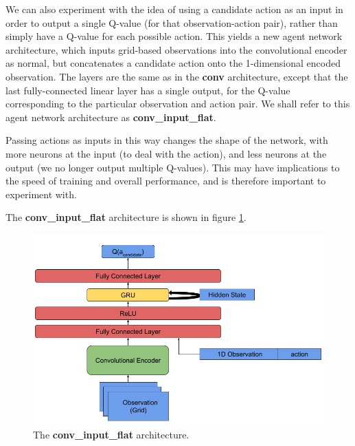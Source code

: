 We can also experiment with the idea of using a candidate action as an input in order to output a single Q-value (for that observation-action pair), rather than simply have a Q-value for each possible action. This yields a new agent network architecture, which inputs grid-based observations into the convolutional encoder as normal, but concatenates a candidate action onto the 1-dimensional encoded observation. The layers are the same as in the \textbf{conv} architecture, except that the last fully-connected linear layer has a single output, for the Q-value corresponding to the particular observation and action pair. We shall refer to this agent network architecture as \textbf{conv\_input\_flat}. 

Passing actions as inputs in this way changes the shape of the network, with more neurons at the input (to deal with the action), and less neurons at the output (we no longer output multiple Q-values). This may have implications to the speed of training and overall performance, and is therefore important to experiment with. 

The \textbf{conv\_input\_flat} architecture is shown in figure \ref{fig:conv_input_flat_diagram}.

\begin{figure}
    \centering
    \includegraphics[scale=0.45]{images/agent_diagrams/rnn_mathias_agent_diagram.png}
    \caption{The \textbf{conv\_input\_flat} architecture.}
    \label{fig:conv_input_flat_diagram}
\end{figure}


